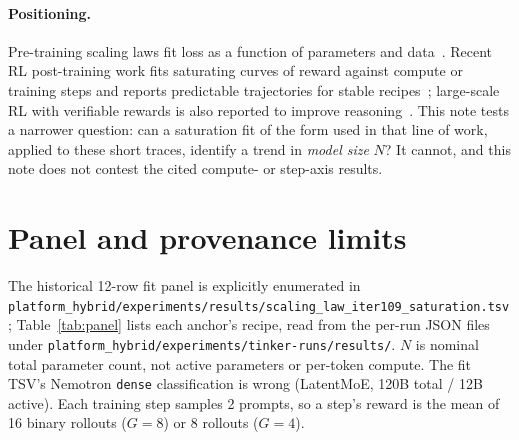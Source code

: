 \documentclass[11pt]{article}
\begin{document}
\paragraph{Positioning.} Pre-training scaling laws fit loss as a function of
parameters and data~\cite{kaplan2020scaling,hoffmann2022chinchilla}. Recent RL
post-training work fits saturating curves of reward against compute or training
steps and reports predictable trajectories for stable
recipes~\cite{khatri2025artscaling,nimmaturi2025predictive}; large-scale RL with
verifiable rewards is also reported to improve reasoning~\cite{deepseek2025r1}.
This note tests a narrower question: can a saturation fit of the form used in
that line of work, applied to these short traces, identify a trend in
\emph{model size} $N$? It cannot, and this note does not contest the cited
compute- or step-axis results.

\section{Panel and provenance limits}

The historical 12-row fit panel is explicitly enumerated in
\nolinkurl{platform_hybrid/experiments/results/scaling_law_iter109_saturation.tsv};
Table~\ref{tab:panel} lists each anchor's recipe, read from the per-run JSON
files under \nolinkurl{platform_hybrid/experiments/tinker-runs/results/}.
$N$ is nominal total parameter count, not active parameters or per-token
compute. The fit TSV's Nemotron \texttt{dense} classification is wrong
(LatentMoE, 120B total / 12B active). Each training step samples 2 prompts, so a
step's reward is the mean of 16 binary rollouts ($G{=}8$) or 8 rollouts
($G{=}4$).
\end{document}
